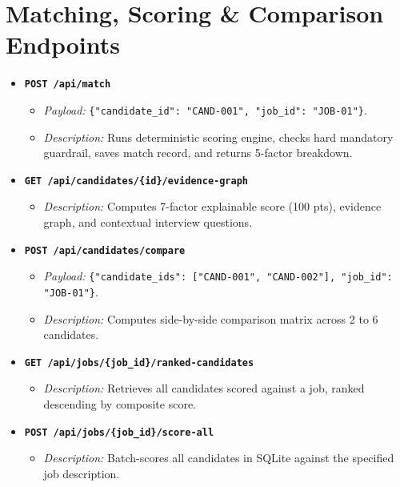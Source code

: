 \documentclass[11pt,a4paper]{report}
\begin{document}
\section{Matching, Scoring \& Comparison Endpoints}
\begin{itemize}[leftmargin=1.5em]
    \item \textbf{\texttt{POST /api/match}}
    \begin{itemize}
        \item \emph{Payload:} \texttt{\{"candidate\_id": "CAND-001", "job\_id": "JOB-01"\}}.
        \item \emph{Description:} Runs deterministic scoring engine, checks hard mandatory guardrail, saves match record, and returns 5-factor breakdown.
    \end{itemize}
    \item \textbf{\texttt{GET /api/candidates/\{id\}/evidence-graph}}
    \begin{itemize}
        \item \emph{Description:} Computes 7-factor explainable score (100 pts), evidence graph, and contextual interview questions.
    \end{itemize}
    \item \textbf{\texttt{POST /api/candidates/compare}}
    \begin{itemize}
        \item \emph{Payload:} \texttt{\{"candidate\_ids": ["CAND-001", "CAND-002"], "job\_id": "JOB-01"\}}.
        \item \emph{Description:} Computes side-by-side comparison matrix across 2 to 6 candidates.
    \end{itemize}
    \item \textbf{\texttt{GET /api/jobs/\{job\_id\}/ranked-candidates}}
    \begin{itemize}
        \item \emph{Description:} Retrieves all candidates scored against a job, ranked descending by composite score.
    \end{itemize}
    \item \textbf{\texttt{POST /api/jobs/\{job\_id\}/score-all}}
    \begin{itemize}
        \item \emph{Description:} Batch-scores all candidates in SQLite against the specified job description.
    \end{itemize}
\end{itemize}
\end{document}
